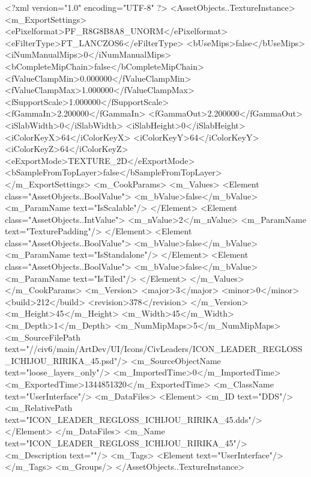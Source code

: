<?xml version="1.0" encoding="UTF-8" ?>
<AssetObjects..TextureInstance>
	<m_ExportSettings>
		<ePixelformat>PF_R8G8B8A8_UNORM</ePixelformat>
		<eFilterType>FT_LANCZOS6</eFilterType>
		<bUseMips>false</bUseMips>
		<iNumManualMips>0</iNumManualMips>
		<bCompleteMipChain>false</bCompleteMipChain>
		<fValueClampMin>0.000000</fValueClampMin>
		<fValueClampMax>1.000000</fValueClampMax>
		<fSupportScale>1.000000</fSupportScale>
		<fGammaIn>2.200000</fGammaIn>
		<fGammaOut>2.200000</fGammaOut>
		<iSlabWidth>0</iSlabWidth>
		<iSlabHeight>0</iSlabHeight>
		<iColorKeyX>64</iColorKeyX>
		<iColorKeyY>64</iColorKeyY>
		<iColorKeyZ>64</iColorKeyZ>
		<eExportMode>TEXTURE_2D</eExportMode>
		<bSampleFromTopLayer>false</bSampleFromTopLayer>
	</m_ExportSettings>
	<m_CookParams>
		<m_Values>
			<Element class="AssetObjects..BoolValue">
				<m_bValue>false</m_bValue>
				<m_ParamName text="IsScalable"/>
			</Element>
			<Element class="AssetObjects..IntValue">
				<m_nValue>2</m_nValue>
				<m_ParamName text="TexturePadding"/>
			</Element>
			<Element class="AssetObjects..BoolValue">
				<m_bValue>false</m_bValue>
				<m_ParamName text="IsStandalone"/>
			</Element>
			<Element class="AssetObjects..BoolValue">
				<m_bValue>false</m_bValue>
				<m_ParamName text="IsTiled"/>
			</Element>
		</m_Values>
	</m_CookParams>
	<m_Version>
		<major>3</major>
		<minor>0</minor>
		<build>212</build>
		<revision>378</revision>
	</m_Version>
	<m_Height>45</m_Height>
	<m_Width>45</m_Width>
	<m_Depth>1</m_Depth>
	<m_NumMipMaps>5</m_NumMipMaps>
	<m_SourceFilePath text="//civ6/main/ArtDev/UI/Icons/CivLeaders/ICON_LEADER_REGLOSS_ICHIJOU_RIRIKA_45.psd"/>
	<m_SourceObjectName text="loose_layers_only"/>
	<m_ImportedTime>0</m_ImportedTime>
	<m_ExportedTime>1344851320</m_ExportedTime>
	<m_ClassName text="UserInterface"/>
	<m_DataFiles>
		<Element>
			<m_ID text="DDS"/>
			<m_RelativePath text="ICON_LEADER_REGLOSS_ICHIJOU_RIRIKA_45.dds"/>
		</Element>
	</m_DataFiles>
	<m_Name text="ICON_LEADER_REGLOSS_ICHIJOU_RIRIKA_45"/>
	<m_Description text=""/>
	<m_Tags>
		<Element text="UserInterface"/>
	</m_Tags>
	<m_Groups/>
</AssetObjects..TextureInstance>


